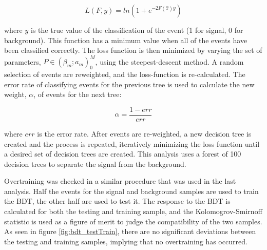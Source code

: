 \begin{equation}\label{eq:bdt_loss_function}
L(F,y) = ln\left( 1+ e^{-2F(\hat{x})y}\right)
\end{equation}

\noindent where $y$ is the true value of the classification of the
event (1 for signal, 0 for background).  This function has a minimum
value when all of the events have been classified correctly.  The loss
function is then minimized by varying the set of parameters,
$P\in(\beta_{m};a_{m})_{0}^{M}$, using the steepest-descent method.  A
random selection of events are reweighted, and the loss-function is
re-calculated.  The error rate of classifying events for the previous
tree is used to calculate the new weight, $\alpha$, of events for the
next tree: 

\begin{equation}\label{bdt_event_reweight}
\alpha = \frac{1-err}{err}
\end{equation}

\noindent where $err$ is the error rate.  After events are
re-weighted, a new decision tree is created and the process is
repeated, iteratively minimizing the loss function until a desired set
of decision trees are created.  This analysis uses a forest of 100
decision trees to separate the \ttH signal from the \ttjets
background.  

\par  Overtraining was checked in a similar procedure that was used in
the last analysis.  Half the events for the signal and background
samples are used to train the BDT, the other half are used to test
it.  The response to the BDT is calculated for both the testing and
training sample, and the Kolomogrov-Smirnoff statistic is used as a
figure of merit to judge the compatibility of the two samples.  As
seen in figure \ref{fig:bdt_testTrain}, there are no significant
deviations between  the testing and training samples, implying that no
overtraining has occurred.  

